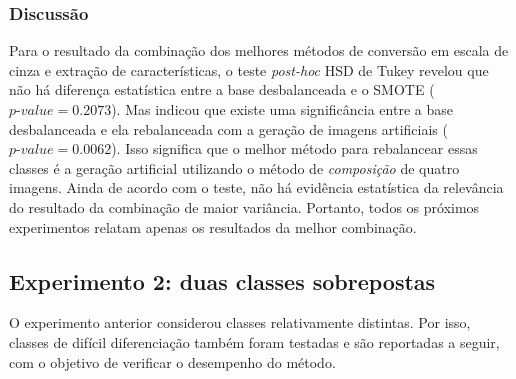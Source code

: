 \subsubsection*{Discussão}


Para o resultado da combinação dos melhores métodos de conversão em escala de cinza e extração de características, o teste \textit{post-hoc} HSD de Tukey revelou que não há diferença estatística entre a base desbalanceada e o SMOTE ($\textit{p-value} = 0.2073$). Mas indicou que existe uma significância entre a base desbalanceada e ela rebalanceada com a geração de imagens artificiais ($\textit{p-value} = 0.0062$). Isso significa que o melhor método para rebalancear essas classes é a geração artificial utilizando o método de \emph{composição} de quatro imagens. Ainda de acordo com o teste, não há evidência estatística da relevância do resultado da combinação de maior variância. Portanto, todos os próximos experimentos relatam apenas os resultados da melhor combinação.

\subsection{Experimento 2: duas classes sobrepostas}

O experimento anterior considerou classes relativamente distintas. Por isso, classes de difícil diferenciação também foram testadas e são reportadas a seguir, com o objetivo de verificar o desempenho do método.

